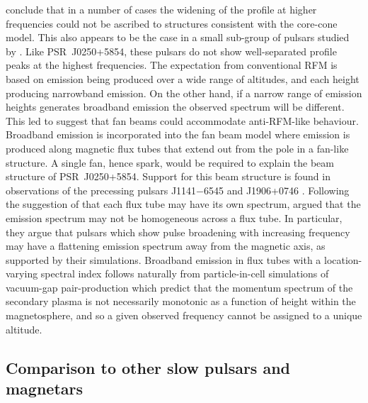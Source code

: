 \citet{CWxx2014} conclude that in a number of cases the widening of the profile at higher frequencies could not be ascribed to structures consistent with the core-cone model. This also appears to be the case in a small sub-group of pulsars studied by \citet{PHS+2016}. Like PSR~J0250+5854, these pulsars do not show well-separated profile peaks at the highest frequencies. The expectation from conventional RFM is based on emission being produced over a wide range of altitudes, and each height producing narrowband emission. On the other hand, if a narrow range of emission heights generates broadband emission the observed spectrum will be different. This led \citet{CWxx2014} to suggest that fan beams could accommodate anti-RFM-like behaviour. Broadband emission is incorporated into the fan beam model \citep{Mxxx1987, DRDx2010, DRxx2012, DRxx2013, WPZ+2014} where emission is produced along magnetic flux tubes that extend out from the pole in a fan-like structure. A single fan, hence spark, would be required to explain the beam structure of PSR~J0250+5854. Support for this beam structure is found in observations of the precessing pulsars J1141$-$6545 and J1906+0746 \citep{MKS+2010, DKC+2013}. Following the suggestion of \citet{Mxxx1987} that each flux tube may have its own spectrum, \citet{CWC+2007} argued that the emission spectrum may not be homogeneous across a flux tube. In particular, they argue that pulsars which show pulse broadening with increasing frequency may have a flattening emission spectrum away from the magnetic axis, as supported by their simulations. Broadband emission in flux tubes with a location-varying spectral index follows naturally from particle-in-cell simulations of vacuum-gap pair-production \citep{Txxx2010} which predict that the momentum spectrum of the secondary plasma is not necessarily monotonic as a function of height within the magnetosphere, and so a given observed frequency cannot be assigned to a unique altitude.


















\subsection{Comparison to other slow pulsars and magnetars}
\label{sec: J0250 - discussion - magnetar comparison}

